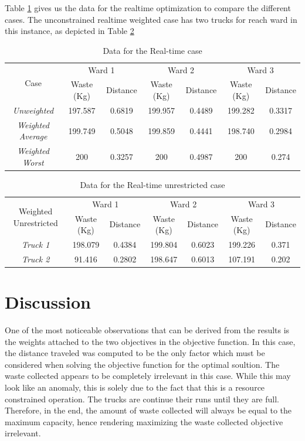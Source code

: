 \documentclass[12pt]{article}
\begin{document}
Table \ref{tab2} gives us the data for the realtime optimization to compare the different cases. The unconstrained realtime weighted case has two trucks for reach ward in this instance, as depicted in Table \ref{tab3}
\begin{table}[H]
    \centering
    \caption{Data for the Real-time case} \label{tab2}
    \vspace*{0.3cm}
    \begin{tabular}{|c|c|c|c|c|c|c|}
        \hline \multirow{2}{*}{Case} & \multicolumn{2}{c|}{Ward 1} & \multicolumn{2}{c|}{Ward 2} & \multicolumn{2}{c|}{Ward 3}\\
        \cline{2-7}& Waste (Kg) & Distance & Waste (Kg) & Distance & Waste (Kg) & Distance\\ 
        \hline \textit{Unweighted} & 197.587 & 0.6819 & 199.957 & 0.4489 & 199.282 & 0.3317 \\
        \hline \textit{Weighted Average} & 199.749 & 0.5048 & 199.859 & 0.4441 & 198.740 & 0.2984 \\
        \hline \textit{Weighted Worst} & 200 & 0.3257 & 200 & 0.4987 & 200 & 0.274 \\
        \hline
    \end{tabular}
\end{table}
\begin{table}[H]
    \centering
    \caption{Data for the Real-time unrestricted case} \label{tab3}
    \vspace*{0.3cm}
    \begin{tabular}{|c|c|c|c|c|c|c|}
        \hline \multirow{2}{*}{Weighted Unrestricted} & \multicolumn{2}{c|}{Ward 1} & \multicolumn{2}{c|}{Ward 2} & \multicolumn{2}{c|}{Ward 3}\\
        \cline{2-7}& Waste (Kg) & Distance & Waste (Kg) & Distance & Waste (Kg) & Distance\\ 
        \hline \textit{Truck 1} & 198.079 & 0.4384 & 199.804 & 0.6023 & 199.226 & 0.371 \\
        \hline \textit{Truck 2} & 91.416 & 0.2802 & 198.647 & 0.6013 & 107.191 & 0.202 \\
        \hline
    \end{tabular}
\end{table}

\section{Discussion}
One of the most noticeable observations that can be derived from the results is the weights attached to the two objectives in the objective function. In this case, the distance traveled was computed to be the only factor which must be considered when solving the objective function for the optimal soultion. The waste collected appears to be completely irrelevant in this case. While this may look like an anomaly, this is solely due to the fact that this is a resource constrained operation. The trucks are continue their runs until they are full. Therefore, in the end, the amount of waste collected will always be equal to the maximum capacity, hence rendering maximizing the waste collected objective irrelevant.
\end{document}
